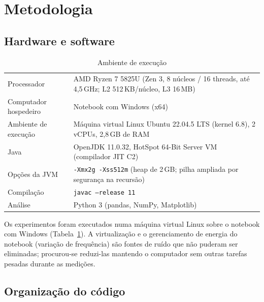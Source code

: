\documentclass[11pt,a4paper]{article}
\begin{document}
\section{Metodologia}

\subsection{Hardware e software}

\begin{table}[htbp]\centering\small
\caption{Ambiente de execução}\label{tab:ambiente}
\begin{tabular}{lp{11.2cm}}
\toprule
Processador & AMD Ryzen 7 5825U (Zen 3, 8 núcleos / 16 threads, até 4,5\,GHz; L2 512\,KB/núcleo, L3 16\,MB) \\
Computador hospedeiro & Notebook com Windows (x64) \\
Ambiente de execução & Máquina virtual Linux Ubuntu 22.04.5 LTS (kernel 6.8), 2 vCPUs, 2,8\,GB de RAM \\
Java & OpenJDK 11.0.32, HotSpot 64-Bit Server VM (compilador JIT C2) \\
Opções da JVM & \texttt{-Xmx2g -Xss512m} (heap de 2\,GB; pilha ampliada por segurança na recursão) \\
Compilação & \texttt{javac --release 11} \\
Análise & Python 3 (pandas, NumPy, Matplotlib) \\
\bottomrule
\end{tabular}
\end{table}

Os experimentos foram executados numa máquina virtual Linux sobre o notebook com Windows
(Tabela~\ref{tab:ambiente}). A virtualização e o gerenciamento de energia do notebook (variação de
frequência) são fontes de ruído que não puderam ser eliminadas; procurou-se reduzi-las mantendo
o computador sem outras tarefas pesadas durante as medições.

\subsection{Organização do código}
\end{document}
